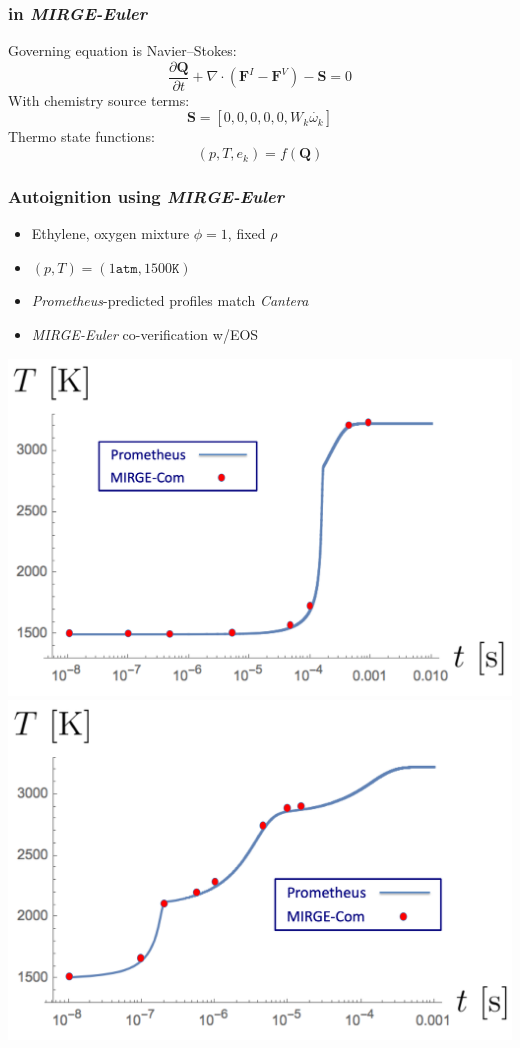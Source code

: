 \begin{frame}\frametitle{\pyrometheus in \textit{MIRGE-Euler}}
  \begin{multicols}{2}
    Governing equation is Navier--Stokes:
    \begin{equation*}
      \frac{\partial\mathbf{Q}}{\partial{t}} + \nabla \cdot (\mathbf{F}^I - \mathbf{F}^V) - \mathbf{S} = 0
    \end{equation*}
    With chemistry source terms:
    \begin{equation*}
      \mathbf{S} = [ 0, 0, 0, 0, 0, W_k\dot{\omega_k} ]
    \end{equation*}
    Thermo state functions:
    \begin{equation*}
      (p, T, e_k) = f(\mathbf{Q})
    \end{equation*}
    \begin{center}
    \end{center}
    \columnbreak
  \end{multicols}
\end{frame}

\begin{frame}\frametitle{Autoignition using \textit{MIRGE-Euler}}
  \begin{multicols}{2}
    \begin{itemize}
      \item Ethylene, oxygen mixture $\phi=1$, fixed $\rho$
      \item $(p, T) = (1 \mathtt{atm}, 1500 \mathtt{K})$
      \item \textit{Prometheus}-predicted profiles match \textit{Cantera}
      \item \textit{MIRGE-Euler} co-verification w/\pyrometheus EOS
    \end{itemize}
  \end{multicols}
  \begin{multicols}{2}
    \includegraphics[width=.5\textwidth]{figures/mtc/AutoIgnition_Sudden.png}\\
    \columnbreak
    \includegraphics[width=.5\textwidth]{figures/mtc/AutoIgnition_Episodic.png}
  \end{multicols}
\end{frame}

